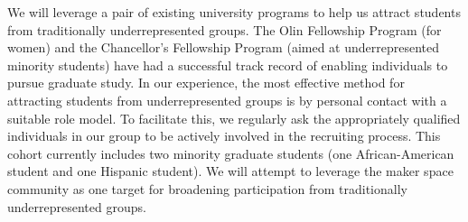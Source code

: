 We will leverage a pair of existing university programs to help us
attract students from traditionally underrepresented groups.  The Olin
Fellowship Program (for women) and the Chancellor's Fellowship Program
(aimed at underrepresented minority students) have had a successful track
record of enabling individuals to pursue graduate study.  In our
experience, the most effective method for attracting students from
underrepresented groups is by personal contact with a suitable role
model.  To facilitate this, we regularly ask the appropriately
qualified individuals in our group to be actively involved in the
recruiting process.  This cohort currently includes two
minority graduate students (one African-American student and one Hispanic 
student).
We will attempt to leverage the maker space community as one target
for broadening participation from traditionally underrepresented groups.
